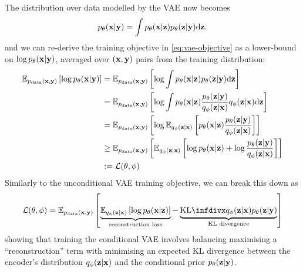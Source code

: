 The distribution over data modelled by the VAE now becomes
\begin{equation} \label{eq:conditional-vae-marginal}
p_\theta({\mathbf{x}}|{\mathbf{y}}) = \int p_\theta({\mathbf{x}}|{\mathbf{z}})p_\theta({\mathbf{z}}|{\mathbf{y}}) \mathrm{d}{\mathbf{z}}.
\end{equation}
and we can re-derive the training objective in \cref{eq:vae-objective} as a lower-bound on $\log p_\theta({\mathbf{x}}|{\mathbf{y}})$, averaged over $({\mathbf{x}}, {\mathbf{y}})$ pairs from the training distribution:
\begin{align}
    \mathbb{E}_{p_{\rm{data}}({\mathbf{x}}, {\mathbf{y}})} \left[ \log p_\theta({\mathbf{x}}|{\mathbf{y}}) \right] &= \mathbb{E}_{p_{\rm{data}}({\mathbf{x}}, {\mathbf{y}})} \left[ \log \int p_\theta({\mathbf{x}}|{\mathbf{z}})p_\theta({\mathbf{z}}|{\mathbf{y}}) \mathrm{d}{\mathbf{z}} \right] \\
    &= \mathbb{E}_{p_{\rm{data}}({\mathbf{x}}, {\mathbf{y}})} \left[ \log \int p_\theta({\mathbf{x}}|{\mathbf{z}})\frac{p_\theta({\mathbf{z}}|{\mathbf{y}})}{q_\phi({\mathbf{z}}|{\mathbf{x}})}q_\phi({\mathbf{z}}|{\mathbf{x}}) \mathrm{d}{\mathbf{z}} \right] \\
    &= \mathbb{E}_{p_{\rm{data}}({\mathbf{x}}, {\mathbf{y}})} \left[ \log \mathbb{E}_{q_\phi({\mathbf{z}}|{\mathbf{x}})} \left[ p_\theta({\mathbf{x}}|{\mathbf{z}})\frac{p_\theta({\mathbf{z}}|{\mathbf{y}})}{q_\phi({\mathbf{z}}|{\mathbf{x}})} \right] \right] \\
    &\geq \mathbb{E}_{p_{\rm{data}}({\mathbf{x}}, {\mathbf{y}})} \left[ \mathbb{E}_{q_\phi({\mathbf{z}}|{\mathbf{x}})} \left[ \log p_\theta({\mathbf{x}}|{\mathbf{z}}) + \log \frac{p_\theta({\mathbf{z}}|{\mathbf{y}})}{q_\phi({\mathbf{z}}|{\mathbf{x}})} \right] \right] \\
    &:= {\mathcal{L}}(\theta, \phi)
\end{align}
Similarly to the unconditional VAE training objective, we can break this down as
\begin{align} \label{eq:conditional-vae-objective}
    \gL(\theta, \phi) = \EX_{\pdata(\rvx,\rvy)} \left[ \underbrace{\EX_{q_\phi(\rvz|\rvx)}\left[\log p_\theta(\rvx|\rvz) \right]}_\text{reconstruction loss} - \underbrace{\kl{q_\phi(\rvz|\rvx)}{p_\theta(\rvz|\rvy)}}_\text{KL divergence} \right]
\end{align}
showing that training the conditional VAE involves balancing maximising a ``reconstruction'' term with minimising an expected KL divergence between the encoder's distribution $q_\phi({\mathbf{z}}|{\mathbf{x}})$ and the conditional prior $p_\theta({\mathbf{z}}|{\mathbf{y}})$.

